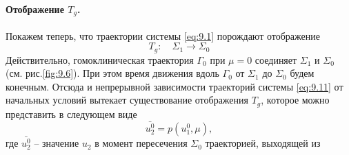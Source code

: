 \paragraph{Отображение $T_g$.}%
Покажем теперь, что траектории системы \eqref{eq:9.1} порождают отображение
\begin{equation}
        \label{eq:}
        T_g: \quad \Sigma_1 \to \Sigma_0
\end{equation}
Действительно, гомоклиническая траектория $\Gamma_0$ при $\mu=0$ соединяет
$\Sigma_1$ и $\Sigma_0$ (см. рис.\ref{fig:9.6}). При этом время движения вдоль $\Gamma_0$ 
от $\Sigma_1$ до $\Sigma_0$ будем конечным.
Отсюда и непрерывной зависимости траекторий системы \eqref{eq:9.11} от начальных
условий вытекает существование отображения $T_g$, которое можно представить в
следующем виде
\begin{equation}
        \label{eq:9.21}
        \bar{ u_2^0} = p(u_1^0, \mu),
\end{equation}
где $\bar {u_2^0}$ -- значение $u_2$ в момент пересечения  $\Sigma_0$ траекторией, выходящей из 


